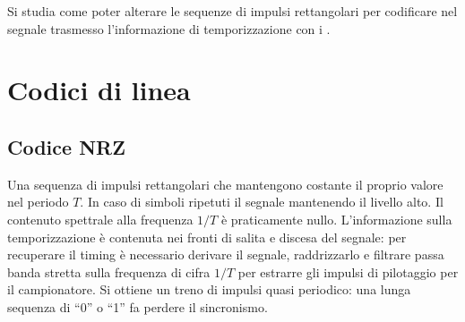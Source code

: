 Si studia come poter alterare le sequenze di impulsi rettangolari per codificare nel segnale trasmesso l'informazione di temporizzazione con i .

\section{Codici di linea}
\subsection{Codice \ac{NRZ}}
Una sequenza di impulsi rettangolari che mantengono costante il proprio valore nel periodo $T$. In caso di simboli ripetuti il segnale  mantenendo il livello alto. Il contenuto spettrale alla frequenza $1/T$ è praticamente nullo.
L'informazione sulla temporizzazione è contenuta nei fronti di salita e discesa del segnale: per recuperare il timing è necessario derivare il segnale, raddrizzarlo e filtrare passa banda stretta sulla frequenza di cifra $1/T$ per estrarre gli impulsi di pilotaggio per il campionatore. Si ottiene un treno di impulsi quasi periodico: una lunga sequenza di “0” o “1” fa perdere il sincronismo.


